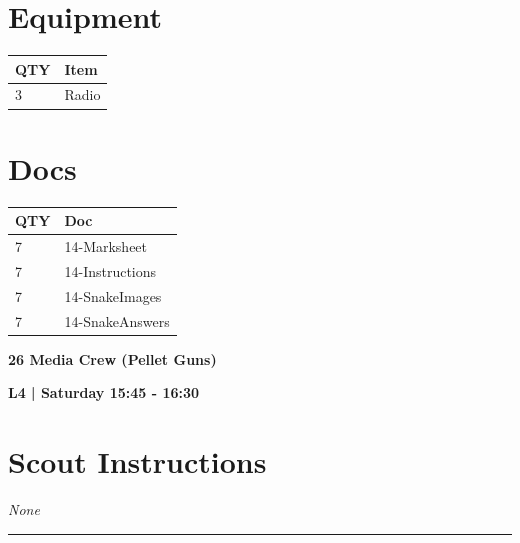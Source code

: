 \documentclass[10pt]{article}
\newcommand{\newtitle}[1]{\begin{center}{\Huge\bfseries #1 }\\ \vspace{5mm}\end{center}}
\newcommand{\newsubtitle}[1]{\begin{center}{\color{grey}\Large\bfseries #1 }\\ \vspace{5mm}\end{center}}
\begin{document}
	\begin{multicols}{2}

		\section*{\faWrench \: Equipment}

		
	\begin{center}
			\begin{tabular}{p{2cm}p{4cm}}


				\textbf{QTY} & \textbf{Item} \\\toprule
												3&Radio\\\midrule
								\end{tabular}

			\end{center}

		
		\vfill\null
		\columnbreak

			\section*{\faFile \: Docs}
		 	\begin{center}
			\begin{tabular}{p{2cm}p{4cm}}

			\textbf{QTY} & \textbf{Doc} \\\toprule
										7&14-Marksheet\\\midrule
										7&14-Instructions\\\midrule
										7&14-SnakeImages\\\midrule
										7&14-SnakeAnswers\\\midrule
							\end{tabular}
			\end{center}
	

		\vfill\null

		\end{multicols}



	\vspace{1cm}


	\clearpage
		\newtitle{26 Media Crew (Pellet Guns) }
	\newsubtitle{L4 | Saturday 15:45 - 16:30}
		\setcounter{section}{25}
	\section*{Scout Instructions}
		\textit{None}
	
	\vspace{0.5cm}
	\hrule
	\vspace{0.5cm}
\end{document}
